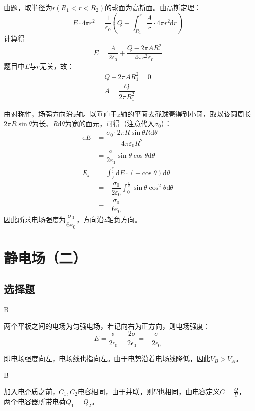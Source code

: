 \documentclass[b5paper,opensource,sourcefont,parskip]{qyxf-book}
\newcommand{\di}[1]{\mathrm{d}#1}
\begin{document}

\solve
由题，取半径为$r(R_1<r<R_2)$的球面为高斯面。由高斯定理：
\begin{equation*}
E\cdot 4\pi r^2=\dfrac{1}{\varepsilon_0}(Q+\int_{R_1}^r\dfrac{A}{r}\cdot 4\pi r^2\di{r})
\end{equation*}
计算得：
\begin{equation*}
E=\dfrac{A}{2\varepsilon_0}+\dfrac{Q-2\pi AR_1^2}{4\pi r^2\varepsilon_0}
\end{equation*}
题目中$E$与$r$无关，故：
\begin{gather*}
Q-2\pi AR_1^2=0\\
A=\dfrac{Q}{2\pi R_1^2}
\end{gather*}


\solve
由对称性，场强方向沿$z$轴。以垂直于$z$轴的平面去截球壳得到小圆，取以该圆周长$2\pi R\sin\theta$为长、$R\di{\theta}$为宽的面元，可得（注意代入$\sigma_0$）：
\begin{align*}
\di{E}&=\dfrac{\sigma_0\cdot 2\pi R\sin \theta R\di{\theta}}{4\pi \varepsilon_0 R^2}\\
&=\dfrac{\sigma}{2\varepsilon_0}\sin\theta\cos\theta\di{\theta}\\
E_z&=\int_0^{\frac{\pi}{2}}\di{E}\cdot(-\cos\theta)\di{\theta}\\
&=-\dfrac{\sigma_0}{2\varepsilon_0}\int_0^{\frac{\pi}{2}}\sin\theta\cos^2\theta\di{\theta}\\
&=-\dfrac{\sigma_0}{6\varepsilon_0}
\end{align*}
因此所求电场强度为$\dfrac{\sigma_0}{6\varepsilon_0}$，方向沿$z$轴负方向。

\chapter{静电场（二）} 
\section{选择题} 

B 

\solve
两个平板之间的电场为匀强电场，若记向右为正方向，则电场强度：
\[E=\frac{\sigma}{2\epsilon_0}-\frac{2\sigma}{2\epsilon_0}=-\frac{\sigma}{2\epsilon_0}\]

即电场强度向左，电场线也指向左。由于电势沿着电场线降低，因此$V_B>V_A$。

B

\solve 加入电介质之前，$ C_1,C_2 $电容相同，由于并联，则$ U $也相同，由电容定义$ C=\frac{Q}{U} $，两个电容器所带电荷$ Q_1=Q_2 $。
\end{document}
